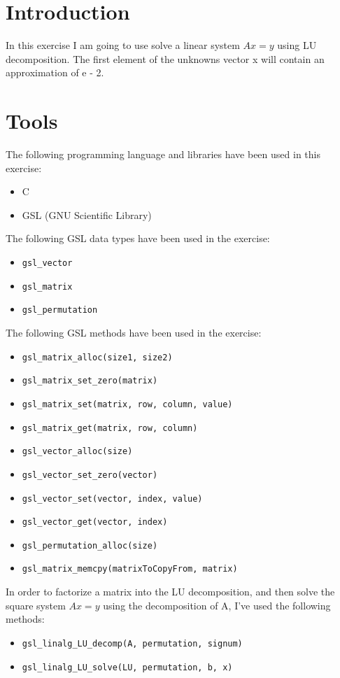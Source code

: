 \documentclass{article}
\newcommand{\code}{\texttt}
\begin{document}

\section{Introduction}\label{sec:intro}
In this exercise I am going to use solve a linear system $Ax=y$ using LU decomposition. The first element of the unknowns vector x will contain an approximation of e - 2.\\

\section{Tools}
The following programming language and libraries have been used in this exercise:
\begin{itemize}
  \item C
  \item GSL (GNU Scientific Library)
\end{itemize}
The following GSL data types have been used in the exercise:
\begin{itemize}
  \item \code{gsl\_vector}
  \item \code{gsl\_matrix}
  \item \code{gsl\_permutation}
\end{itemize}
The following GSL methods have been used in the exercise:
\begin{itemize}
  \item \code{gsl\_matrix\_alloc(size1, size2)}
  \item \code{gsl\_matrix\_set\_zero(matrix)}
  \item \code{gsl\_matrix\_set(matrix, row, column, value)}
  \item \code{gsl\_matrix\_get(matrix, row, column)}
  \item \code{gsl\_vector\_alloc(size)}
  \item \code{gsl\_vector\_set\_zero(vector)}
  \item \code{gsl\_vector\_set(vector, index, value)}
  \item \code{gsl\_vector\_get(vector, index)}
  \item \code{gsl\_permutation\_alloc(size)}
  \item \code{gsl\_matrix\_memcpy(matrixToCopyFrom, matrix)}
\end{itemize}
In order to factorize a matrix into the LU decomposition, and then solve the square system $Ax=y$ using the decomposition of A, I've used the following methods:
\begin{itemize}
  \item \code{gsl\_linalg\_LU\_decomp(A, permutation, signum)}
  \item \code{gsl\_linalg\_LU\_solve(LU, permutation, b, x)}
\end{itemize}
  
\end{document}
